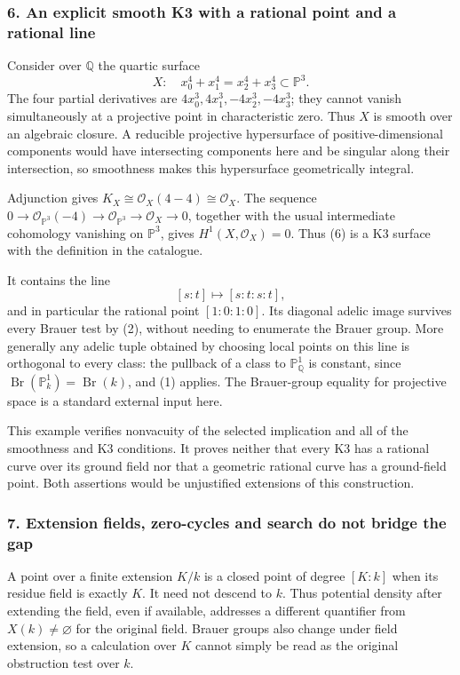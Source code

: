 \documentclass[11pt]{article}
\begin{document}
\subsubsection{6. An explicit smooth K3 with a rational point and a rational line}
Consider over $\mathbb Q$ the quartic surface
\[
 X:\quad x_0^4+x_1^4=x_2^4+x_3^4\subset\mathbb P^3.
                                                               \tag{6}
\]
The four partial derivatives are $4x_0^3,4x_1^3,-4x_2^3,-4x_3^3$; they cannot vanish simultaneously at a projective point in characteristic zero. Thus $X$ is smooth over an algebraic closure. A reducible projective hypersurface of positive-dimensional components would have intersecting components here and be singular along their intersection, so smoothness makes this hypersurface geometrically integral.

Adjunction gives $K_X\cong\mathcal O_X(4-4)\cong\mathcal O_X$. The sequence
$0\to\mathcal O_{\mathbb P^3}(-4)\to\mathcal O_{\mathbb P^3}\to\mathcal O_X\to0$, together with the usual intermediate cohomology vanishing on $\mathbb P^3$, gives $H^1(X,\mathcal O_X)=0$. Thus (6) is a K3 surface with the definition in the catalogue.

It contains the line
\[
 [s:t]\longmapsto[s:t:s:t],
\]
and in particular the rational point $[1:0:1:0]$. Its diagonal adelic image survives every Brauer test by (2), without needing to enumerate the Brauer group. More generally any adelic tuple obtained by choosing local points on this line is orthogonal to every class: the pullback of a class to $\mathbb P^1_\mathbb Q$ is constant, since $\operatorname{Br}(\mathbb P^1_k)=\operatorname{Br}(k)$, and (1) applies. The Brauer-group equality for projective space is a standard external input here.

This example verifies nonvacuity of the selected implication and all of the smoothness and K3 conditions. It proves neither that every K3 has a rational curve over its ground field nor that a geometric rational curve has a ground-field point. Both assertions would be unjustified extensions of this construction.

\subsubsection{7. Extension fields, zero-cycles and search do not bridge the gap}
A point over a finite extension $K/k$ is a closed point of degree $[K:k]$ when its residue field is exactly $K$. It need not descend to $k$. Thus potential density after extending the field, even if available, addresses a different quantifier from $X(k)\ne\varnothing$ for the original field. Brauer groups also change under field extension, so a calculation over $K$ cannot simply be read as the original obstruction test over $k$.
\end{document}
